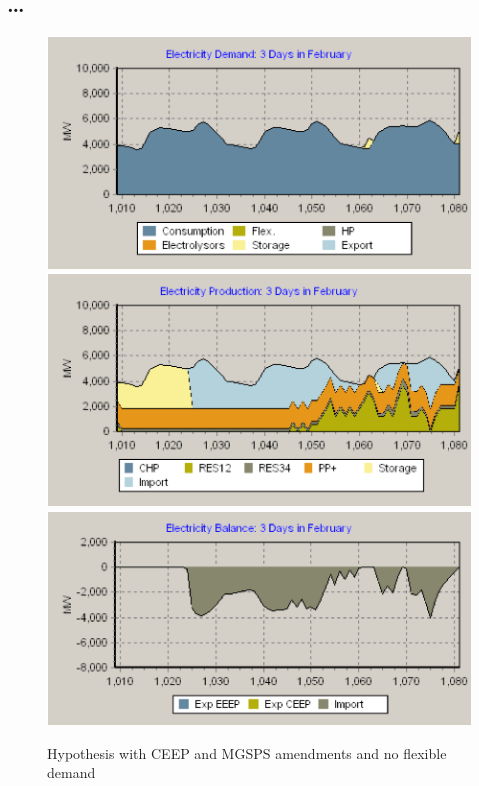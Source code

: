 \clearpage
\begin{appendices}

  \section{\ldots}
  \begin{figure}[htbp]
    \centering
    \centering
    \includegraphics[scale=1.4]{figures/B14-3day-demand.png}
    \includegraphics[scale=1.4]{figures/B14-3day-production.png}
    \includegraphics[scale=1.4]{figures/B14-3day-balance.png}
    \caption{Hypothesis with CEEP and MGSPS amendments and no flexible demand}
    \label{app:B14}
  \end{figure}


\end{appendices}
